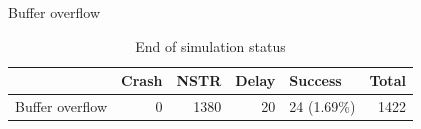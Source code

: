 \begin{frame}{Buffer overflow}
    \begin{table}[]
        \centering
        \small
        \caption{End of simulation status}
        \label{table:end_sim_by_status}
        \begin{tabular}{lrrrlr}
            \toprule
                            & Crash & NSTR & Delay & Success     & Total \\
            \midrule
            Buffer overflow & 0     & 1380 & 20    & 24 (1.69\%) & 1422  \\
            \bottomrule
        \end{tabular}
    \end{table}

    \begin{table}[]
        \centering
        \small
        \caption{Buffer overflow : Register sensitivity as determined by fault model and simulation time}
        \label{table:end_sim_from_time_fault_register_buffer_overflow}
\end{table}
\end{frame}
